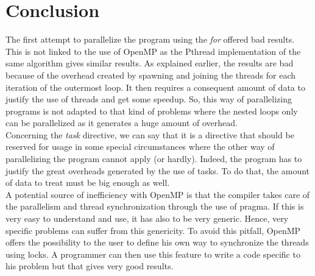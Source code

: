 \chapter{Conclusion}

The first attempt to parallelize the program using the \textit{for} offered bad results. This is not linked to the use of OpenMP as the Pthread implementation of the same algorithm gives similar results. As explained earlier, the results are bad because of the overhead created by spawning and joining the threads for each iteration of the outermost loop. It then requires a consequent amount of data to justify the use of threads and get some speedup. So, this way of parallelizing programs is not adapted to that kind of problems where the nested loops only can be parallelized as it generates a huge amount of overhead.\\ 

Concerning the \textit{task} directive, we can say that it is a directive that should be reserved for usage in some special circumstances where the other way of parallelizing the program cannot apply (or hardly). Indeed, the program has to justify the great overheads generated by the use of tasks. To do that, the amount of data to treat must be big enough as well.\\

A potential source of inefficiency with OpenMP is that the compiler takes care of the parallelism and thread synchronization through the use of pragma. If this is very easy to understand and use, it has also to be very generic. Hence, very specific problems can suffer from this genericity. To avoid this pitfall, OpenMP offers the possibility to the user to define his own way to synchronize the threads using locks. A programmer can then use this feature to write a code specific to his problem but that gives very good results. 
